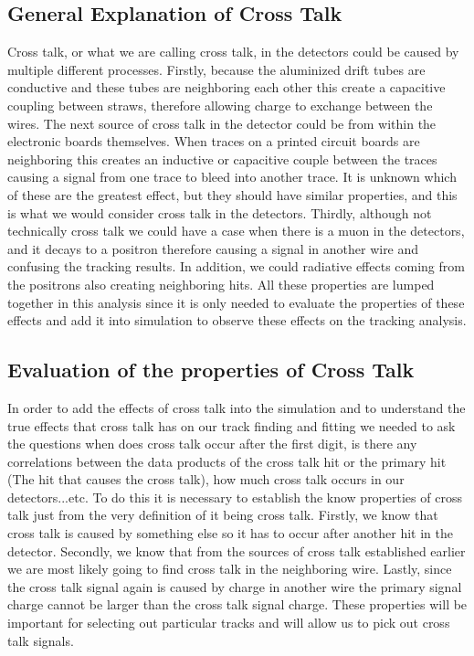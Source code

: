 \documentclass[./Thesis]{subfiles}
\begin{document}
\subsection{General Explanation of Cross Talk}

	Cross talk, or what we are calling cross talk, in the detectors could be caused by multiple different processes.  Firstly, because the aluminized drift tubes are conductive and these tubes are neighboring each other this create a capacitive coupling between straws, therefore allowing charge to exchange between the wires.  The next source of cross talk in the detector could be from within the electronic boards themselves.  When traces on a printed circuit boards are neighboring this creates an inductive or capacitive couple between the traces causing a signal from one trace to bleed into another trace.  It is unknown which of these are the greatest effect, but they should have similar properties, and this is what we would consider cross talk in the detectors.  Thirdly, although not technically cross talk we could have a case when there is a muon in the detectors, and it decays to a positron therefore causing a signal in another wire and confusing the tracking results.  In addition, we could radiative effects coming from the positrons also creating neighboring hits.  All these properties are lumped together in this analysis since it is only needed to evaluate the properties of these effects and add it into simulation to observe these effects on the tracking analysis.
	
\subsection{Evaluation of the properties of Cross Talk}

	In order to add the effects of cross talk into the simulation and to understand the true effects that cross talk has on our track finding and fitting we needed to ask the questions when does cross talk occur after the first digit, is there any correlations between the data products of the cross talk hit or the primary hit (The hit that causes the cross talk), how much cross talk occurs in our detectors...etc. To do this it is necessary to establish the know properties of cross talk just from the very definition of it being cross talk. Firstly, we know that cross talk is caused by something else so it has to occur after another hit in the detector. Secondly, we know that from the sources of cross talk established earlier we are most likely going to find cross talk in the neighboring wire. Lastly, since the cross talk signal again is caused by charge in another wire the primary signal charge cannot be larger than the cross talk signal charge.  These properties will be important for selecting out particular tracks and will allow us to pick out cross talk signals.
	
\end{document}
